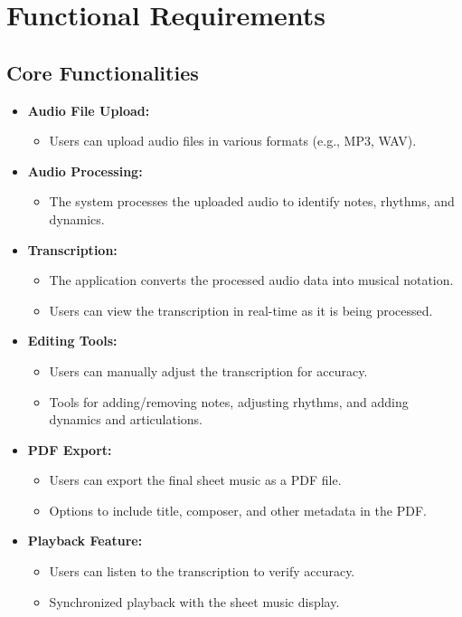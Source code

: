 \documentclass{article}
\begin{document}
\section{Functional Requirements}

\subsection{Core Functionalities}
\begin{itemize}
    \item \textbf{Audio File Upload:}
    \begin{itemize}
        \item Users can upload audio files in various formats (e.g., MP3, WAV).
    \end{itemize}
    \item \textbf{Audio Processing:}
    \begin{itemize}
        \item The system processes the uploaded audio to identify notes, rhythms, and dynamics.
    \end{itemize}
    \item \textbf{Transcription:}
    \begin{itemize}
        \item The application converts the processed audio data into musical notation.
        \item Users can view the transcription in real-time as it is being processed.
    \end{itemize}
    \item \textbf{Editing Tools:}
    \begin{itemize}
        \item Users can manually adjust the transcription for accuracy.
        \item Tools for adding/removing notes, adjusting rhythms, and adding dynamics and articulations.
    \end{itemize}
    \item \textbf{PDF Export:}
    \begin{itemize}
        \item Users can export the final sheet music as a PDF file.
        \item Options to include title, composer, and other metadata in the PDF.
    \end{itemize}
    \item \textbf{Playback Feature:}
    \begin{itemize}
        \item Users can listen to the transcription to verify accuracy.
        \item Synchronized playback with the sheet music display.
    \end{itemize}
\end{itemize}
\end{document}
